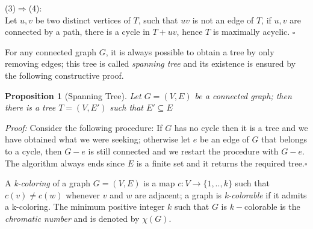 \documentclass[a4paper,12pt,oneside]{book}
\newtheorem{proposition}[theorem]{Proposition}
\newcommand*{\QED}{\hfill\ensuremath{\square}}
\begin{document}
(3)$\Rightarrow$(4):\\
Let $u,v$ be two distinct vertices of $T$, such that $uv$ is not an edge of $T$, if $u,v$ are connected by a path, there is a cycle in $T+uv$, hence $T$ is maximally acyclic. \QED

 For any connected graph $G$, it is always possible to obtain a tree by only removing edges; this tree is called \textit{spanning tree} and its existence is ensured by the following constructive proof.
\begin{proposition}[Spanning Tree]
Let $G=(V,E)$ be a connected graph; then there is a tree $T=(V,E')$ such that $E'\subseteq E$
\end{proposition}
\textit{Proof:}
Consider the following procedure: If $G$ has no cycle then it is a tree and we have obtained what we were seeking; otherwise let $e$ be an edge of $G$ that belongs to a cycle, then $G-e$ is still connected and we restart the procedure with $G-e$.
The algorithm always ends since $E$ is a finite set and it returns the required tree.\QED


A \textit{k-coloring} of a graph $G=(V,E)$ is a map $c:V \rightarrow \{1,..,k\} $ such that $c(v) \neq c(w) $ whenever $v$ and $w$ are adjacent; a graph is \textit{k-colorable} if it admits a k-coloring. The minimum positive integer $k$ such that $G$ is $k-$colorable is the \textit{chromatic number} and is denoted by $\chi (G)$.
\end{document}
